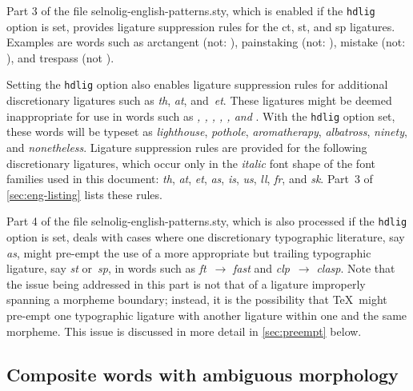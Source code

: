 \documentclass[11pt]{article}
\newcommand{\pkg}[1]{\textsf{#1}}
\newcommand{\opt}[1]{\texttt{#1}}
\begin{document}
Part 3 of the file \pkg{selnolig-english-patterns.sty}, which is enabled if the \opt{hdlig} option is set, provides ligature suppression rules for the ct, st, and sp ligatures. Examples are words such as arctangent (not: ), painstaking (not: ), mistake (not: ), and trespass (not ). 

Setting the \opt{hdlig} option also enables ligature suppression rules for additional discretionary ligatures such as \emph{th}, \emph{at}, and~\emph{et}. These ligatures might be deemed inappropriate for use in words such as \emph{, , , , , \emph{and} }. With the \opt{hdlig} option set, these words will be typeset as \emph{lighthouse}, \emph{pothole}, \emph{aromatherapy}, \emph{albatross}, \emph{ninety}, and \emph{nonetheless}. Ligature suppression rules are provided for the following discretionary ligatures, which occur only in the \emph{italic} font shape of the font families used in this document: \emph{th}, \emph{at}, \emph{et}, \emph{as}, \emph{is}, \emph{us}, \emph{ll}, \emph{fr}, and {\ebg \emph{sk}}. Part~3 of \cref{sec:eng-listing} lists these rules.

Part 4 of the file \pkg{selnolig-english-patterns.sty}, which is also processed if the \opt{hdlig} option is set, deals with cases where one discretionary typographic literature, say \emph{as}, might pre-empt the use of a more appropriate but trailing typographic ligature, say \emph{st} or~\emph{sp}, in words such as \emph{ft}~$\to$ \emph{fast} and \emph{clp}~$\to$ \emph{clasp}. Note that the issue being addressed in this part is not that of a ligature improperly spanning a morpheme boundary; instead, it is the possibility that \TeX\ might pre-empt one typographic ligature with another ligature within one and the same morpheme. This issue is discussed in more detail in \cref{sec:preempt} below.

\subsection{Composite words with ambiguous morphology}
\end{document}

